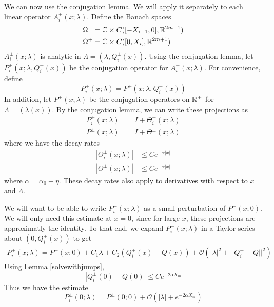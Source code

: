 \documentclass[thesis.tex]{subfiles}
\begin{document}
We can now use the conjugation lemma. We will apply it separately to each linear operator $A_i^\pm(x; \lambda)$. Define the Banach spaces
\begin{align*}
\Omega^- &= {\mathbb C} \times C([-X_{i-1}, 0], {\mathbb R}^{2m+1}) \\
\Omega^+ &= {\mathbb C} \times C([0, X_i], {\mathbb R}^{2m+1})
\end{align*}
$A_i^\pm(x; \lambda)$ is analytic in $\Lambda = (\lambda, Q_i^\pm(x))$. Using the conjugation lemma, let $P_i^\pm(x; \lambda, Q_i^\pm(x) )$ be the conjugation operator for $A_i^\pm(x; \lambda)$. For convenience, define 
\begin{equation}\label{defPipm}
P_i^\pm(x; \lambda) = P^\pm(x; \lambda, Q_i^\pm(x) )
\end{equation}
In addition, let $P^\pm(x; \lambda)$ be the conjugation operators on ${\mathbb R}^\pm$ for $\Lambda = (\lambda(x))$.
By the conjugation lemma, we can write these projections as
\begin{align*}
P_i^\pm(x; \lambda) &= I + \Theta_i^\pm(x; \lambda)  \\
P^\pm(x; \lambda) &= I + \Theta^\pm(x; \lambda)
\end{align*}
where we have the decay rates
\begin{align*}
|\Theta_i^\pm(x; \lambda)| &\leq C e^{-\alpha |x|} \\
|\Theta^\pm(x; \lambda)| &\leq C e^{-\alpha |x|}
\end{align*}
where $\alpha = \alpha_0 - \eta$. These decay rates also apply to derivatives with respect to $x$ and $\Lambda$.

We will want to be able to write $P_i^\pm(x; \lambda)$ as a small perturbation of $P^\pm(x; 0)$. We will only need this estimate at $x = 0$, since for large $x$, these projections are approximatly the identity. To that end, we expand $P_i^\pm(x; \lambda)$ in a Taylor series about $(0, Q_i^\pm(x))$ to get
\begin{align*}
P_i^\pm(x; \lambda) = P^\pm(x; 0) + C_1 \lambda 
+ C_2( Q_i^\pm(x) - Q(x) ) + \mathcal{O}(|\lambda|^2 + ||Q_i^\pm - Q||^2 )
\end{align*}
Using Lemma \ref{solvewithjumps}, 
\begin{equation*}
|Q_i^\pm(0) - Q(0)| \leq C e^{-2 \alpha X_m}
\end{equation*}
Thus we have the estimate
\begin{equation}\label{PTaylor}
P_i^\pm(0; \lambda) = P^\pm(0; 0) + \mathcal{O}(|\lambda| + e^{-2 \alpha X_m})
\end{equation}
\end{document}
